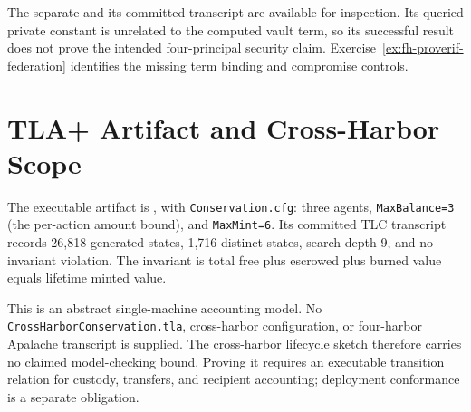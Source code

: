 \documentclass[11pt,a4paper]{article}
\theoremstyle{definition}
\theoremstyle{remark}
\begin{document}
The separate  and its committed transcript are available for inspection. Its queried private constant is unrelated to the computed vault term, so its successful result does not prove the intended four-principal security claim. Exercise~\ref{ex:fh-proverif-federation} identifies the missing term binding and compromise controls.

\section{TLA+ Artifact and Cross-Harbor Scope}\label{app:fh-tla}

The executable artifact is , with \texttt{Conservation.cfg}: three agents, \texttt{MaxBalance=3} (the per-action amount bound), and \texttt{MaxMint=6}. Its committed TLC transcript records 26,818 generated states, 1,716 distinct states, search depth 9, and no invariant violation. The invariant is total free plus escrowed plus burned value equals lifetime minted value.

This is an abstract single-machine accounting model. No \texttt{CrossHarborConservation.tla}, cross-harbor configuration, or four-harbor Apalache transcript is supplied. The cross-harbor lifecycle sketch therefore carries no claimed model-checking bound. Proving it requires an executable transition relation for custody, transfers, and recipient accounting; deployment conformance is a separate obligation.
\end{document}
